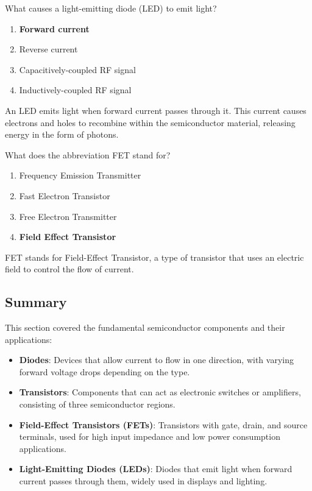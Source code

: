 \begin{tcolorbox}[colback=gray!10!white,colframe=black!75!black,title={T6B07}]
    What causes a light-emitting diode (LED) to emit light?
    \begin{enumerate}[label=\Alph*),noitemsep]
        \item \textbf{Forward current}
        \item Reverse current
        \item Capacitively-coupled RF signal
        \item Inductively-coupled RF signal
    \end{enumerate}
\end{tcolorbox}
An LED emits light when forward current passes through it. This current causes electrons and holes to recombine within the semiconductor material, releasing energy in the form of photons. %

\begin{tcolorbox}[colback=gray!10!white,colframe=black!75!black,title={T6B08}]
    What does the abbreviation FET stand for?
    \begin{enumerate}[label=\Alph*),noitemsep]
        \item Frequency Emission Transmitter
        \item Fast Electron Transistor
        \item Free Electron Transmitter
        \item \textbf{Field Effect Transistor}
    \end{enumerate}
\end{tcolorbox}
FET stands for Field-Effect Transistor, a type of transistor that uses an electric field to control the flow of current. %

\subsection*{Summary}
This section covered the fundamental semiconductor components and their applications:
\begin{itemize}
    \item \textbf{Diodes}: Devices that allow current to flow in one direction, with varying forward voltage drops depending on the type.
    \item \textbf{Transistors}: Components that can act as electronic switches or amplifiers, consisting of three semiconductor regions.
    \item \textbf{Field-Effect Transistors (FETs)}: Transistors with gate, drain, and source terminals, used for high input impedance and low power consumption applications.
    \item \textbf{Light-Emitting Diodes (LEDs)}: Diodes that emit light when forward current passes through them, widely used in displays and lighting.
\end{itemize}
